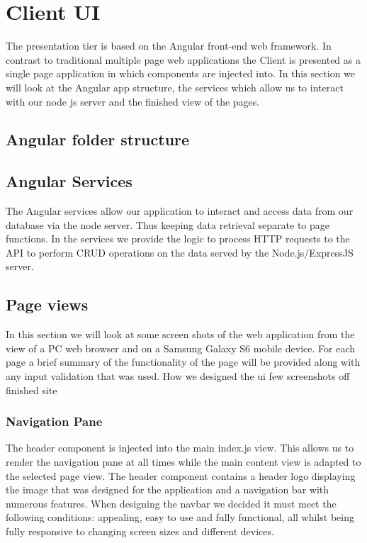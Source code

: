 \section{Client UI}
The presentation tier is based on the Angular front-end web framework. In contrast to traditional multiple page web applications the Client is presented as a single page application in which components are injected into. In this section we will look at the Angular app structure, the services which allow us to interact with our node js server and the finished view of the pages.

\subsection{Angular folder structure}

\subsection{Angular Services}
The Angular services allow our application to interact and access data from our database via the node server. Thus keeping data retrieval separate to page functions. In the services we provide the logic to process HTTP requests to the API to perform CRUD operations on the data served by the Node.js/ExpressJS server. 

\subsection{Page views}
In this section we will look at some screen shots of the web application from the view of a PC web browser and on a Samsung Galaxy S6 mobile device. For each page a brief summary of the functionality of the page will be provided along with any input validation that was used. 
How we designed the ui
few screenshots off finished site


\subsubsection{Navigation Pane}
The header component is injected into the main index.js view. This allows us to render the navigation pane at all times while the main content view is adapted to the selected page view. The header component contains a header logo displaying the image that was designed for the application and a navigation bar with numerous features. When designing the navbar we decided it must meet the following conditions: appealing, easy to use and fully functional, all whilst being fully responsive to changing screen sizes and different devices.

